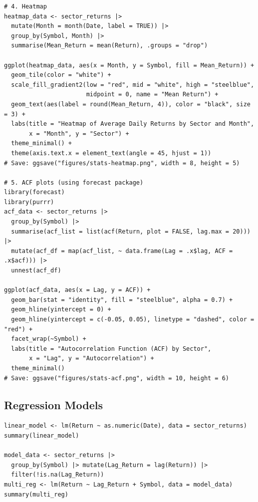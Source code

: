\documentclass[12pt,a4paper,fleqn]{article}
\begin{document}
\begin{tcolorbox}[colback=gray!5, colframe=black!70, fontupper=\small, breakable, title=R Code]
\begin{verbatim}
# 4. Heatmap
heatmap_data <- sector_returns |>
  mutate(Month = month(Date, label = TRUE)) |>
  group_by(Symbol, Month) |>
  summarise(Mean_Return = mean(Return), .groups = "drop")

ggplot(heatmap_data, aes(x = Month, y = Symbol, fill = Mean_Return)) +
  geom_tile(color = "white") +
  scale_fill_gradient2(low = "red", mid = "white", high = "steelblue",
                       midpoint = 0, name = "Mean Return") +
  geom_text(aes(label = round(Mean_Return, 4)), color = "black", size = 3) +
  labs(title = "Heatmap of Average Daily Returns by Sector and Month",
       x = "Month", y = "Sector") +
  theme_minimal() +
  theme(axis.text.x = element_text(angle = 45, hjust = 1))
# Save: ggsave("figures/stats-heatmap.png", width = 8, height = 5)

# 5. ACF plots (using forecast package)
library(forecast)
library(purrr)
acf_data <- sector_returns |>
  group_by(Symbol) |>
  summarise(acf_list = list(acf(Return, plot = FALSE, lag.max = 20))) |>
  mutate(acf_df = map(acf_list, ~ data.frame(Lag = .x$lag, ACF = .x$acf))) |>
  unnest(acf_df)

ggplot(acf_data, aes(x = Lag, y = ACF)) +
  geom_bar(stat = "identity", fill = "steelblue", alpha = 0.7) +
  geom_hline(yintercept = 0) +
  geom_hline(yintercept = c(-0.05, 0.05), linetype = "dashed", color = "red") +
  facet_wrap(~Symbol) +
  labs(title = "Autocorrelation Function (ACF) by Sector",
       x = "Lag", y = "Autocorrelation") +
  theme_minimal()
# Save: ggsave("figures/stats-acf.png", width = 10, height = 6)
\end{verbatim}
\end{tcolorbox}

\subsection*{Regression Models}
\begin{tcolorbox}[colback=gray!5, colframe=black!70, fontupper=\small, breakable, title=R Code]
\begin{verbatim}
linear_model <- lm(Return ~ as.numeric(Date), data = sector_returns)
summary(linear_model)

model_data <- sector_returns |>
  group_by(Symbol) |> mutate(Lag_Return = lag(Return)) |>
  filter(!is.na(Lag_Return))
multi_reg <- lm(Return ~ Lag_Return + Symbol, data = model_data)
summary(multi_reg)
\end{verbatim}
\end{tcolorbox}
\end{document}
